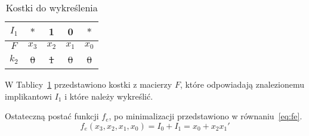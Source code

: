 \begin{table}[H]
    \centering
    \begin{tabular}[t]{ |c|c c c c| }
        \hline
        $I_1$ & $*$ & 1 & 0 & $*$ \\
        \hline\hline
        $F$ & $x_3$ & $x_2$ & $x_1$ & $x_0$ \\
        \hline
        \sout{$k_2$} & \sout{0} & \sout{1} & \sout{0} & \sout{0} \\
        \hline
    \end{tabular}
    \caption{Kostki do wykreślenia}\label{tab:die-1e}
\end{table}
W Tablicy~\ref{tab:die-1e} przedstawiono kostki z macierzy $F$, które odpowiadają znalezionemu implikantowi $I_1$
i które należy wykreślić.

Ostateczną postać funkcji $f_e$, po minimalizacji przedstawiono w równaniu~\ref{eq:fe}.
\begin{equation}
    \label{eq:fe}
    f_e(x_3, x_2, x_1, x_0) = I_0 + I_1 = x_0 + x_{2}x_1'
\end{equation}
